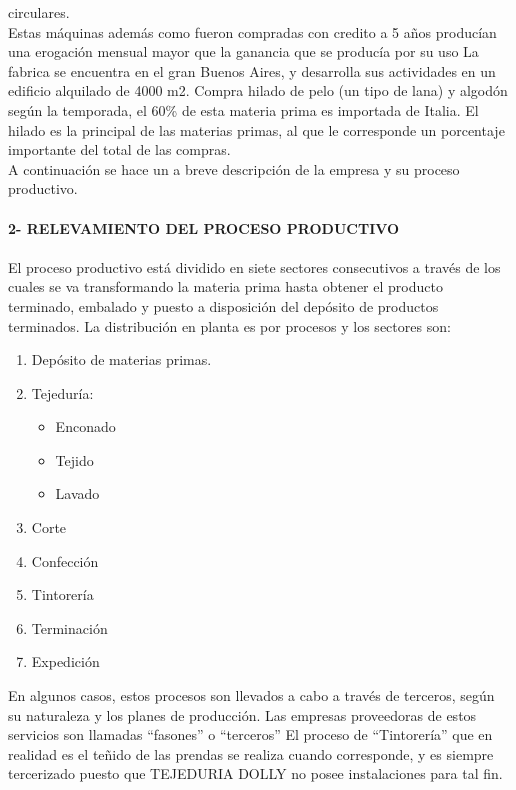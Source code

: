 \documentclass[a4paper,10pt,titlepage]{article}
\begin{document}
circulares.\\
Estas máquinas además como fueron compradas con credito a 5 años producían
una erogación mensual mayor que la ganancia que se producía por su uso
La fabrica se encuentra en el gran Buenos Aires, y desarrolla sus actividades en un
edificio alquilado de 4000 m2. Compra hilado de pelo (un tipo de lana) y algodón
según la temporada, el 60\% de esta materia prima es importada de Italia. El hilado
es la principal de las materias primas, al que le corresponde un porcentaje
importante del total de las compras.\\ 
A continuación se hace un a breve descripción de la empresa y su proceso
productivo.\\ \\

\textbf{2- RELEVAMIENTO DEL PROCESO PRODUCTIVO}\\ \\
El proceso productivo está dividido en siete sectores consecutivos a través de los
cuales se va transformando la materia prima hasta obtener el producto terminado,
embalado y puesto a disposición del depósito de productos terminados. La
distribución en planta es por procesos y los sectores son:\\

\begin{enumerate}
 \item Depósito de materias primas.
 \item Tejedur\'ia: 
\begin{itemize}
 \item Enconado
 \item Tejido
 \item Lavado
\end{itemize}
 \item Corte
 \item Confecci\'on
 \item Tintorer\'ia
 \item Terminaci\'on
 \item Expedici\'on
\end{enumerate}

En algunos casos, estos procesos son llevados a cabo a través de terceros, según
su naturaleza y los planes de producción. Las empresas proveedoras de estos
servicios son llamadas ``fasones'' o ``terceros''
El proceso de ``Tintorería'' que en realidad es el teñido de las prendas se realiza
cuando corresponde, y es siempre tercerizado puesto que TEJEDURIA DOLLY no
posee instalaciones para tal fin.\\
\end{document}
